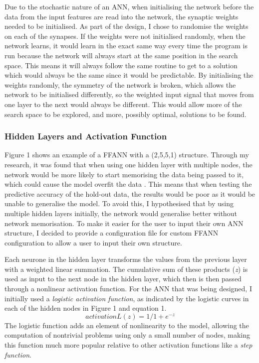 \documentclass[11pt]{article}
\begin{document}
Due to the stochastic nature of an ANN, when initialising the network before the data from the input features are read into the network, the synaptic weights needed to be initialised. As part of the design, I chose to randomise the weights on each of the synapses. If the weights were not initialised randomly, when the network learns, it would learn in the exact same way every time the program is run because the network will always start at the same position in the search space. This means it will always follow the same routine to get to a solution which would always be the same since it would be predictable.  By initialising the weights randomly, the symmetry of the network is broken, which allows the network to be initialised differently, so the weighted input signal that moves from one layer to the next would always be different. This would allow more of the search space to be explored, and more, possibly optimal, solutions to be found.
\subsubsection{Hidden Layers and Activation Function}\label{subsubsec:hiddenL}
Figure 1 shows an example of a FFANN with a (2,5,5,1) structure. Through my research, it was found that when using one hidden layer with multiple nodes, the network would be more likely to start memorising the data being passed to it, which could cause the model overfit the data \cite{ref-nine}. This means that when testing the predictive accuracy of the hold-out data, the results would be poor as it would be unable to generalise the model. To avoid this, I hypothesised that by using multiple hidden layers initially, the network would generalise better without network memorisation. To make it easier for the user to input their own ANN structure, I decided to provide a configuration file for custom FFANN configuration to allow a user to input their own structure. 

Each neurone in the hidden layer transforms the values from the previous layer with a weighted linear summation. The cumulative sum of these products (\textit{z}) is used as input to the next node in the hidden layer, which then is then passed through a nonlinear activation function. For the ANN that was being designed, I initially used a \textit{logistic activation function}, as indicated by the logistic curves in each of the hidden nodes in Figure 1 and equation 1. \begin{equation} activationL(z) = 1/1+e^{-z} \end{equation}
The logistic function adds an element of nonlinearity to the model, allowing the computation of nontrivial problems using only a small number of nodes, making this function much more popular relative to other activation functions like a \textit{step function}.
\end{document}
